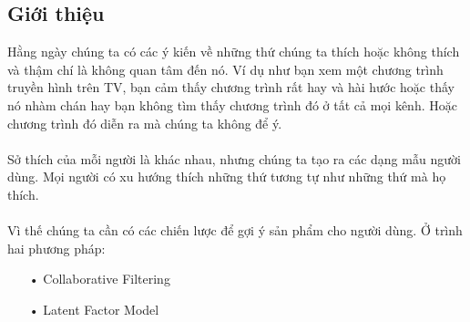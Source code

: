 \documentclass[a0,portrait,11pt]{a0poster}
\begin{document}
\begin{multicols}{2} %

%
%

\color{Black} %
\begin{mybox}
\section*{Giới thiệu}
Hằng ngày chúng ta có các ý kiến về những thứ chúng ta thích hoặc không
thích và thậm chí là không quan tâm đến nó. Ví dụ như bạn xem một chương
trình truyền hình trên TV, bạn cảm thấy chương trình rất hay và hài hước
hoặc thấy nó nhàm chán hay bạn không tìm thấy chương trình đó ở tất cả
mọi kênh. Hoặc chương trình đó diễn ra mà chúng ta không để ý. \\ \\
Sở thích của mỗi người là khác nhau, nhưng chúng ta tạo ra các dạng
mẫu người dùng. Mọi người có xu hướng thích những thứ tương tự như những
thứ mà họ thích. \\ \\
Vì thế chúng ta cần có các chiến lược để gợi ý sản phẩm cho người dùng. Ở trình 
hai phương pháp:
\begin{itemize}
\item[•] Collaborative Filtering
\item[•] Latent Factor Model
\end{itemize}
\end{mybox}
\begin{mybox}

\end{mybox}
\end{multicols}
\end{document}
